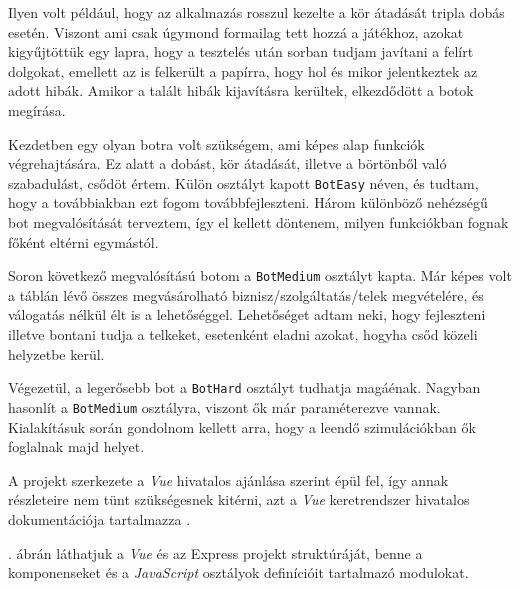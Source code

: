 Ilyen volt például, hogy az alkalmazás rosszul kezelte a kör átadását tripla dobás esetén. Viszont ami csak úgymond formailag tett hozzá a játékhoz, azokat kigyűjtöttük egy lapra, hogy a tesztelés után sorban tudjam javítani a felírt dolgokat, emellett az is felkerült a papírra, hogy hol és mikor jelentkeztek az adott hibák. Amikor a talált hibák kijavításra kerültek, elkezdődött a botok megírása.

Kezdetben egy olyan botra volt szükségem, ami képes alap funkciók végrehajtására. Ez alatt a dobást, kör átadását, illetve a börtönből való szabadulást, csődöt értem. Külön osztályt kapott \texttt{BotEasy} néven, és tudtam, hogy a továbbiakban ezt fogom továbbfejleszteni. Három különböző nehézségű bot megvalósítását terveztem, így el kellett döntenem, milyen funkciókban fognak főként eltérni egymástól.

Soron következő megvalósítású botom a \texttt{BotMedium} osztályt kapta. Már képes volt a táblán lévő összes megvásárolható biznisz/szolgáltatás/telek megvételére, és válogatás nélkül élt is a lehetőséggel. Lehetőséget adtam neki, hogy fejleszteni illetve bontani tudja a telkeket, esetenként eladni azokat, hogyha csőd közeli helyzetbe kerül.

Végezetül, a legerősebb bot a \texttt{BotHard} osztályt tudhatja magáénak. Nagyban hasonlít a \texttt{BotMedium} osztályra, viszont ők már paraméterezve vannak. Kialakításuk során gondolnom kellett arra, hogy a leendő szimulációkban ők foglalnak majd helyet.

\newpage
{}

A projekt szerkezete a \textit{Vue} hivatalos ajánlása szerint épül fel, így annak részleteire nem tünt szükségesnek kitérni, azt a \textit{Vue} keretrendszer hivatalos dokumentációja tartalmazza \cite{filipova2016learning}.

. ábrán láthatjuk a \textit{Vue} és az Express projekt struktúráját, benne a komponenseket és a \textit{JavaScript} osztályok definícióit tartalmazó modulokat.

